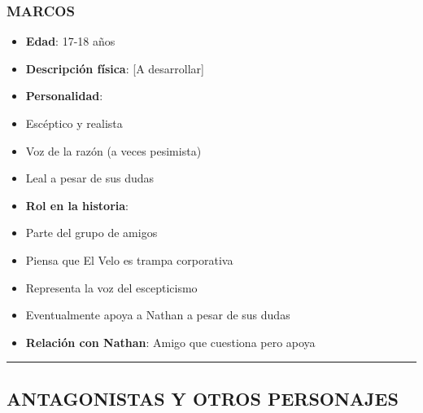 \documentclass[11pt,a4paper]{report}
\begin{document}
\subsubsection{MARCOS}
\begin{itemize}
  \item \textbf{Edad}: 17-18 años
  \item \textbf{Descripción física}: [A desarrollar]
  \item \textbf{Personalidad}: 
  \item Escéptico y realista
  \item Voz de la razón (a veces pesimista)
  \item Leal a pesar de sus dudas
  \item \textbf{Rol en la historia}: 
  \item Parte del grupo de amigos
  \item Piensa que El Velo es trampa corporativa
  \item Representa la voz del escepticismo
  \item Eventualmente apoya a Nathan a pesar de sus dudas
  \item \textbf{Relación con Nathan}: Amigo que cuestiona pero apoya

\end{itemize}
\bigskip\hrule\bigskip

\subsection{ANTAGONISTAS Y OTROS PERSONAJES}
\end{document}
